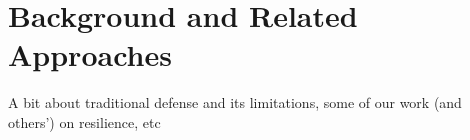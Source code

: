 \section{Background and Related Approaches}\label{sec:background}
A bit about traditional defense and its limitations, some of our work (and others') on resilience, etc
